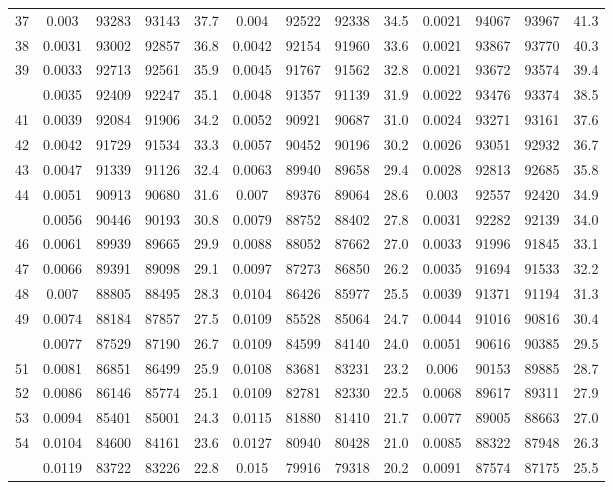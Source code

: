 \documentclass[
  14pt,
]{article}
\begin{document}
\begin{longtable}[t]{lcccccccccccc}
37 & 0.003 & 93283 & 93143 & 37.7 & 0.004 & 92522 & 92338 & 34.5 & 0.0021 & 94067 & 93967 & 41.3\\
38 & 0.0031 & 93002 & 92857 & 36.8 & 0.0042 & 92154 & 91960 & 33.6 & 0.0021 & 93867 & 93770 & 40.3\\
39 & 0.0033 & 92713 & 92561 & 35.9 & 0.0045 & 91767 & 91562 & 32.8 & 0.0021 & 93672 & 93574 & 39.4\\
\addlinespace
40 & 0.0035 & 92409 & 92247 & 35.1 & 0.0048 & 91357 & 91139 & 31.9 & 0.0022 & 93476 & 93374 & 38.5\\
41 & 0.0039 & 92084 & 91906 & 34.2 & 0.0052 & 90921 & 90687 & 31.0 & 0.0024 & 93271 & 93161 & 37.6\\
42 & 0.0042 & 91729 & 91534 & 33.3 & 0.0057 & 90452 & 90196 & 30.2 & 0.0026 & 93051 & 92932 & 36.7\\
43 & 0.0047 & 91339 & 91126 & 32.4 & 0.0063 & 89940 & 89658 & 29.4 & 0.0028 & 92813 & 92685 & 35.8\\
44 & 0.0051 & 90913 & 90680 & 31.6 & 0.007 & 89376 & 89064 & 28.6 & 0.003 & 92557 & 92420 & 34.9\\
\addlinespace
45 & 0.0056 & 90446 & 90193 & 30.8 & 0.0079 & 88752 & 88402 & 27.8 & 0.0031 & 92282 & 92139 & 34.0\\
46 & 0.0061 & 89939 & 89665 & 29.9 & 0.0088 & 88052 & 87662 & 27.0 & 0.0033 & 91996 & 91845 & 33.1\\
47 & 0.0066 & 89391 & 89098 & 29.1 & 0.0097 & 87273 & 86850 & 26.2 & 0.0035 & 91694 & 91533 & 32.2\\
48 & 0.007 & 88805 & 88495 & 28.3 & 0.0104 & 86426 & 85977 & 25.5 & 0.0039 & 91371 & 91194 & 31.3\\
49 & 0.0074 & 88184 & 87857 & 27.5 & 0.0109 & 85528 & 85064 & 24.7 & 0.0044 & 91016 & 90816 & 30.4\\
\addlinespace
50 & 0.0077 & 87529 & 87190 & 26.7 & 0.0109 & 84599 & 84140 & 24.0 & 0.0051 & 90616 & 90385 & 29.5\\
51 & 0.0081 & 86851 & 86499 & 25.9 & 0.0108 & 83681 & 83231 & 23.2 & 0.006 & 90153 & 89885 & 28.7\\
52 & 0.0086 & 86146 & 85774 & 25.1 & 0.0109 & 82781 & 82330 & 22.5 & 0.0068 & 89617 & 89311 & 27.9\\
53 & 0.0094 & 85401 & 85001 & 24.3 & 0.0115 & 81880 & 81410 & 21.7 & 0.0077 & 89005 & 88663 & 27.0\\
54 & 0.0104 & 84600 & 84161 & 23.6 & 0.0127 & 80940 & 80428 & 21.0 & 0.0085 & 88322 & 87948 & 26.3\\
\addlinespace
55 & 0.0119 & 83722 & 83226 & 22.8 & 0.015 & 79916 & 79318 & 20.2 & 0.0091 & 87574 & 87175 & 25.5\\

\end{longtable}
\end{document}
